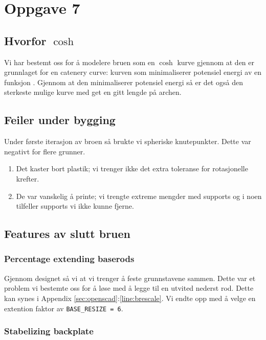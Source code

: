 \documentclass{report}
\begin{document}
\section{Oppgave 7}

\subsection {Hvorfor $\cosh$}

Vi har bestemt oss for å modelere bruen som en $\cosh$ kurve gjennom at den er grunnlaget for en catenery curve: kurven som minimaliserer potensiel energi av en funksjon \cite{wiki:catenery}. Gjennom at den minimaliserer potensiel energi så er det også den sterkeste mulige kurve med get en gitt lengde på archen.

\subsection {Feiler under bygging}

Under første iterasjon av broen så brukte vi spheriske knutepunkter. Dette var negativt for flere grunner.
\begin{enumerate}
	\item Det kaster bort plastik; vi trenger ikke det extra toleranse for rotasjonelle krefter.
	\item De var vanskelig å printe; vi trengte extreme mengder med supports og i noen tilfeller supports vi ikke kunne fjerne.
\end{enumerate}

\subsection {Features av slutt bruen}

\subsubsection {Percentage extending baserods}

Gjennom designet så vi at vi trenger å feste grunnstavene sammen. Dette var et problem vi bestemte oss for å løse med å legge til en utvited nederst rod. Dette kan synes i Appendix \ref{sec:openscad}:\ref{line:brescale}. Vi endte opp med å velge en extention faktor av \lstinline{BASE_RESIZE = 6}.

\subsubsection {Stabelizing backplate}
\end{document}

